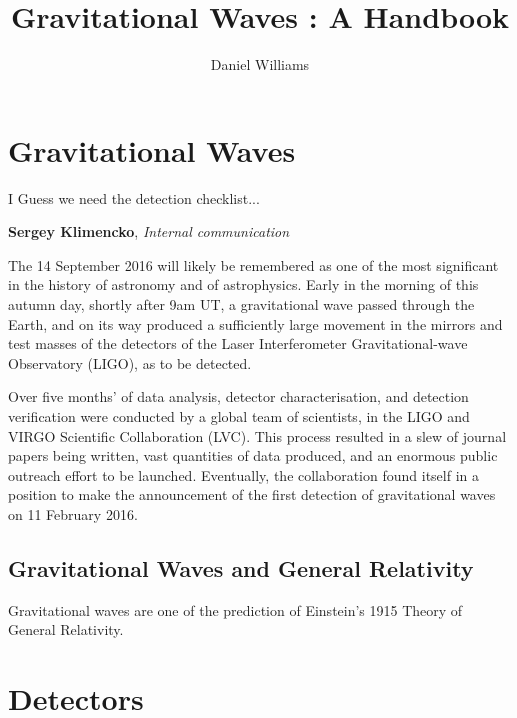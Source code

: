 \documentclass{kentigern}
\title{Gravitational Waves : A Handbook}
\author{Daniel Williams}
\begin{document}
\maketitle

\newpage

\tableofcontents

\chapter{Gravitational Waves}
\label{cha:grav-waves}


\epigraph{I Guess we need the detection checklist...}{\textbf{Sergey Klimencko}, \emph{Internal communication}}

The 14 September 2016 will likely be remembered as one of the most
significant in the history of astronomy and of astrophysics. Early in
the morning of this autumn day, shortly after 9am UT, a gravitational
wave passed through the Earth, and on its way produced a sufficiently
large movement in the mirrors and test masses of the detectors of the
Laser Interferometer Gravitational-wave Observatory (\gls{LIGO}), as to be
detected.

Over five months' of data analysis, detector characterisation, and
detection verification were conducted by a global team of scientists,
in the LIGO and VIRGO Scientific Collaboration (LVC). This process
resulted in a slew of journal papers being written, vast quantities of
data produced, and an enormous public outreach effort to be
launched. Eventually, the collaboration found itself in a position to
make the announcement of the first detection of gravitational waves on
11 February 2016.


\section{Gravitational Waves and General Relativity}
\label{sec:grav-waves-gener}

Gravitational waves are one of the prediction of Einstein's 1915 Theory of General Relativity.

\chapter{Detectors}
\label{cha:detectors}
\end{document}
